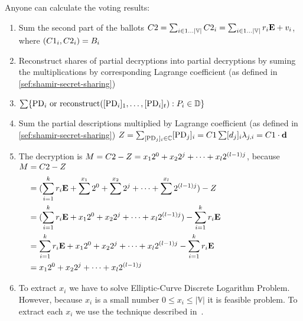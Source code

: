 \documentclass{article}
\begin{document}
Anyone can calculate the voting results:
\begin{enumerate}
    \item Sum the second part of the ballots $C2 = \sum_{i \in 1 \dots |\mathbb{V}|} C2_{i} = \sum_{i \in 1 \dots |\mathbb{V}|} r_{i} \textbf{E} + v_{i}$, where $(C1_{i},C2_{i})=B_{i}$
    
    \item Reconstruct shares of partial decryptions into partial decryptions by suming the multiplications by corresponding Lagrange coefficient (as defined in \ref{sef:shamir-secret-sharing}) %

    \item $\sum \{\mathrm{PD}_{i} \textrm{ or reconstruct}([\mathrm{PD}_{i}]_{1},\dots,[\mathrm{PD}_{i}]_{t}) : P_i \in \mathbb{D}\}$
    \item Sum the partial descriptions multiplied by Lagrange coefficient (as defined in \ref{sef:shamir-secret-sharing}) $Z=\sum_{[\mathrm{PD}_{j}]_{i} \in \mathbb{C}} [\mathrm{PD}_{j}]_{i} = C1 \sum  [d_{j}]_{i} \lambda_{j,i} = C1 \cdot \textbf{d}{}$
    
    \item The decryption is $M=C2{} - Z=x_1 2^0 + x_2 2^j + \dots + x_l 2^{(l-1)j}$, because $\begin{aligned} M&=C2-Z \\
        &= (\sum_{i=1}^k r_{i} \mathbf{E} + \sum^{x_1} 2^0 + \sum^{x_2} 2^j + \dots + \sum^{x_l} 2^{(l-1)j}) - Z\\
        &= (\sum_{i=1}^k r_{i} \mathbf{E} + x_1 2^0 + x_2 2^j + \dots + x_l 2^{(l-1)j}) - \sum_{i=1}^k r_{i} \mathbf{E}\\
        &= \sum_{i=1}^k r_{i} \mathbf{E} + x_1 2^0 + x_2 2^j + \dots + x_l 2^{(l-1)j} - \sum_{i=1}^k r_{i} \mathbf{E}\\
        &= x_1 2^0 + x_2 2^j + \dots + x_l 2^{(l-1)j}\\
        \end{aligned}$
    \item To extract $x_i$ we have to solve Elliptic-Curve Discrete Logarithm Problem. However, because $x_i$ is a small number $0 \leq x_i \leq |\mathbb{V}|$ it is feasible problem. To extract each $x_i$ we use the technique described in~\cite{haoAnonymousVotingTworound2010}.
\end{enumerate}
\end{document}
